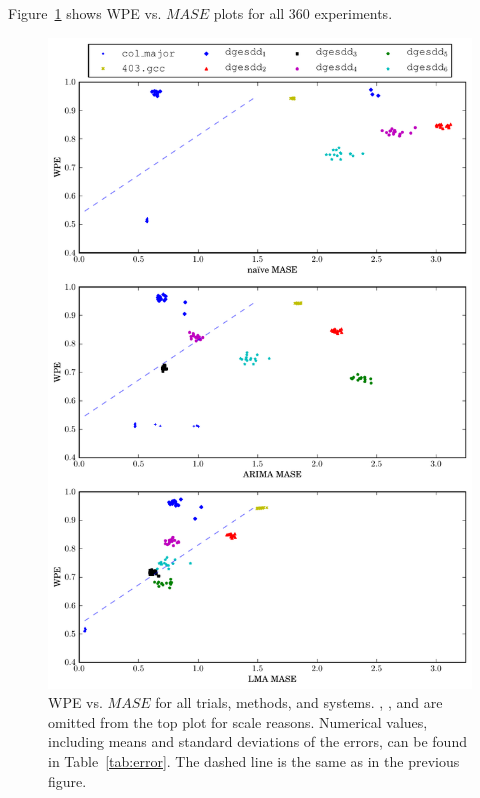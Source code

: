 Figure~\ref{fig:wpe_vs_mase_all} shows WPE vs. $MASE$ plots for all 360
experiments.
\begin{figure}
  \centering
  \includegraphics[width=\columnwidth]{figs/predictions_vs_entropy3}
\caption{WPE vs. $MASE$ for all trials, methods, and systems. \svdone,
  \svdthree, and \svdfive are omitted from the top plot for scale
  reasons.
% 
% 
Numerical values, including means and standard deviations of the
errors, can be found in Table~\ref{tab:error}.  The dashed line is the
same as in the previous figure.
}
    \label{fig:wpe_vs_mase_all}
\end{figure} 
